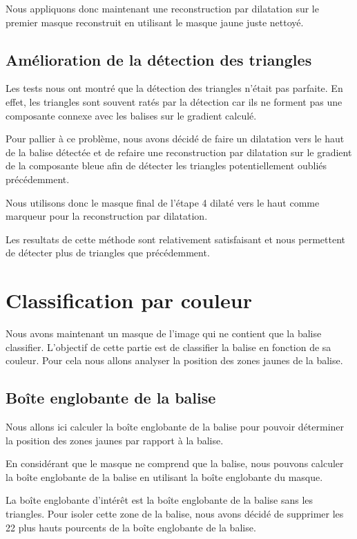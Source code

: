 \documentclass{article}
\begin{document}
Nous appliquons donc maintenant une reconstruction par dilatation sur le
premier masque reconstruit en utilisant le masque jaune juste nettoyé.

\subsection{Amélioration de la détection des triangles}

Les tests nous ont montré que la détection des triangles n'était pas parfaite.
En effet, les triangles sont souvent ratés par la détection car ils ne forment
pas une composante connexe avec les balises sur le gradient calculé.

Pour pallier à ce problème, nous avons décidé de faire un dilatation vers le
haut de la balise détectée et de refaire une reconstruction par dilatation sur
le gradient de la composante bleue afin de détecter les triangles
potentiellement oubliés précédemment.

Nous utilisons donc le masque final de l'étape 4 dilaté vers le haut comme
marqueur pour la reconstruction par dilatation.

Les resultats de cette méthode sont relativement satisfaisant et nous
permettent de détecter plus de triangles que précédemment.

\section{Classification par couleur}

Nous avons maintenant un masque de l'image qui ne contient que la balise
classifier. L'objectif de cette partie est de classifier la balise en fonction
de sa couleur. Pour cela nous allons analyser la position des zones jaunes de
la balise.

\subsection{Boîte englobante de la balise}

Nous allons ici calculer la boîte englobante de la balise pour pouvoir
déterminer la position des zones jaunes par rapport à la balise.

En considérant que le masque ne comprend que la balise, nous pouvons calculer
la boîte englobante de la balise en utilisant la boîte englobante du masque.

La boîte englobante d'intérêt est la boîte englobante de la balise sans les
triangles. Pour isoler cette zone de la balise, nous avons décidé de supprimer
les 22 plus hauts pourcents de la boîte englobante de la balise.
\end{document}
